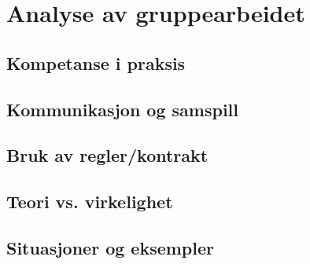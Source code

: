 
\chapter{Analyse av gruppearbeidet}

\section{Kompetanse i praksis}

\section{Kommunikasjon og samspill}

\section{Bruk av regler/kontrakt}

\section{Teori vs. virkelighet}

\section{Situasjoner og eksempler}

